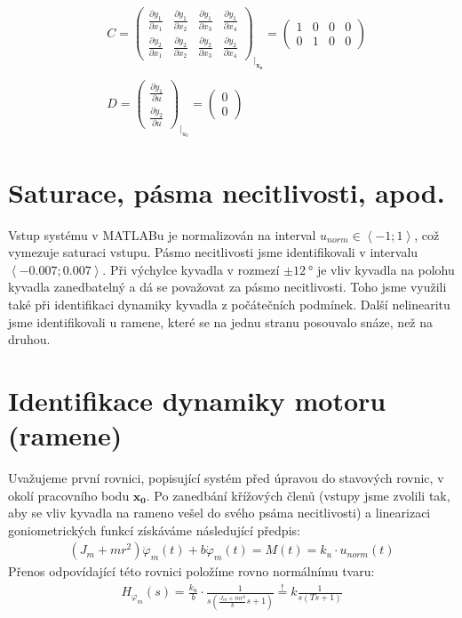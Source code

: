 \documentclass[11pt,a4paper]{article}
\begin{document}
{\begin{align*}
&C =
\begin{pmatrix}
\frac{\partial y_1}{\partial x_1} & \frac{\partial y_1}{\partial x_2} & \frac{\partial y_1}{\partial x_3} & \frac{\partial y_1}{\partial x_4}	\\
\frac{\partial y_2}{\partial x_1} & \frac{\partial y_2}{\partial x_2} & \frac{\partial y_2}{\partial x_3} & \frac{\partial y_2}{\partial x_4}
\end{pmatrix}_{\biggr\rvert_\mathbf{x_0}} =
\left(\begin{array}{cccc} 1 & 0 & 0 & 0\\ 0 & 1 & 0 & 0 \end{array}\right)	\\ \\
&D =
\begin{pmatrix}
\frac{\partial y_1}{\partial u}	\\
\frac{\partial y_2}{\partial u}
\end{pmatrix}_{\biggr\rvert_{u_0}} =
\left(\begin{array}{c} 0\\ 0 \end{array}\right)
\end{align*}
}

\newpage
\section{Saturace, pásma necitlivosti, apod.}
Vstup systému v MATLABu je normalizován na interval $u_{norm} \in \left<-1; 1\right>$, což vymezuje saturaci vstupu. Pásmo necitlivosti jsme identifikovali v intervalu $\left<-0.007; 0.007\right>$.
\newline
\newline
Při výchylce kyvadla v rozmezí $\pm \SI{12}{\degree}$ je vliv kyvadla na polohu kyvadla zanedbatelný a dá se považovat za pásmo necitlivosti. Toho jsme využili také při identifikaci dynamiky kyvadla z počátečních podmínek.
\newline
\newline
Další nelinearitu jsme identifikovali u ramene, které se na jednu stranu posouvalo snáze, než na druhou.

\section{Identifikace dynamiky motoru (ramene)}
Uvažujeme první rovnici, popisující systém před úpravou do stavových rovnic, v okolí pracovního bodu $\mathbf{x_0}$. Po zanedbání křížových členů (vstupy jsme zvolili tak, aby se vliv kyvadla na rameno vešel do svého psáma necitlivosti) a linearizaci goniometrických funkcí získáváme následující předpis:
\begin{align*}
(J_m + mr^2)\ddot{\varphi}_m(t) + b\dot{\varphi}_m(t) = M(t) = k_u\cdot u_{norm}(t)
\end{align*}
Přenos odpovídající této rovnici položíme rovno normálnímu tvaru:
\begin{align*}
H_{\varphi_m}(s) = \frac{k_u}{b}\cdot \frac{1}{s(\frac{J_m + mr^2}{b}s + 1)} \overset{!}{=} k\frac{1}{s(Ts + 1)}
\end{align*}
\end{document}
